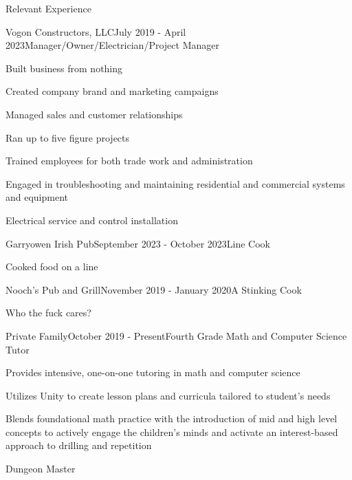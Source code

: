 \documentclass{resume} %
\begin{document}
\begin{rSection}{Relevant Experience}


\begin{rWorkSubsection}{Vogon Constructors, LLC}{July 2019 - April 2023}{Manager/Owner/Electrician/Project Manager}{}
\item Built business from nothing
\item Created company brand and marketing campaigns
\item Managed sales and customer relationships
\item Ran up to five figure projects
\item Trained employees for both trade work and administration
\item Engaged in troubleshooting and maintaining residential and commercial systems and equipment
\item Electrical service and control installation
\end{rWorkSubsection}


\begin{rWorkSubsection}{Garryowen Irish Pub}{September 2023 - October 2023}{Line Cook}{}
\item Cooked food on a line
\end{rWorkSubsection}


\begin{rWorkSubsection}{Nooch's Pub and Grill}{November 2019 - January 2020}{A Stinking Cook}{}
\item Who the fuck cares?
\end{rWorkSubsection}


\begin{rWorkSubsection}{Private Family}{October 2019 - Present}{Fourth Grade Math and Computer Science Tutor}{}
\item Provides intensive, one-on-one tutoring in math and computer science
\item Utilizes Unity to create lesson plans and curricula tailored to student's needs  
\item Blends foundational math practice with the introduction of mid and high level concepts to actively engage the children's minds and activate an interest-based approach to drilling and repetition
\item Dungeon Master
\end{rWorkSubsection}


\end{rSection}
\end{document}
